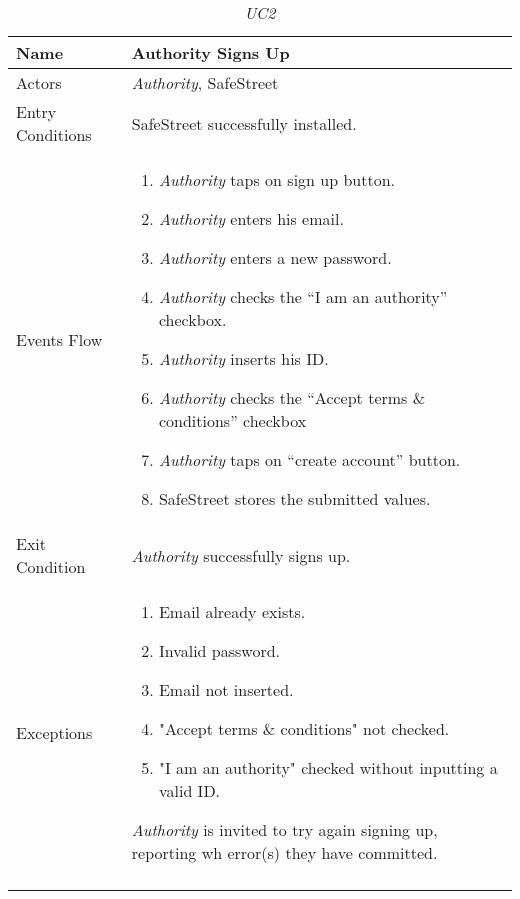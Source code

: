 \documentclass[../../../RASD.tex]{subfiles}
\begin{document}
    \begin{center}
        \begin{longtable}{| p{.35\linewidth} | p{.65\linewidth} |}

            \hline
            \textbf{Name} & \textbf{Authority Signs Up}\\ \hline
            Actors & \textit{Authority}, SafeStreet\\ \hline
            Entry Conditions & SafeStreet successfully installed.\\ \hline
            Events Flow &
            \begin{enumerate}
                \item \textit{Authority} taps on sign up button.
                \item \textit{Authority} enters his email.
                \item \textit{Authority} enters a new password.
                \item \textit{Authority} checks the “I am an authority” checkbox.
                \item \textit{Authority} inserts his ID.
                \item \textit{Authority} checks the “Accept terms \& conditions” checkbox
                \item \textit{Authority} taps on “create account” button.
                \item SafeStreet stores the submitted values.
            \end{enumerate}
            \\ \hline
            Exit Condition & \textit{Authority} successfully signs up.\\ \hline
            Exceptions &
            \begin{enumerate}
                \item Email already exists.
                \item Invalid password.
                \item Email not inserted.
                \item "Accept terms \& conditions" not checked.
                \item "I am an authority" checked without inputting a valid ID.
            \end{enumerate}
            \textit{Authority} is invited to try again signing up, reporting wh error(s) they have committed. \\
            \hline
            \caption[\textit{Use Case 2}]{\textit{UC2}}
        \end{longtable}
    \end{center}
\end{document}
